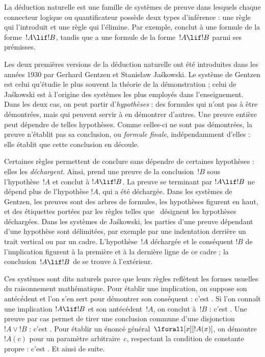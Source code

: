 \documentclass[../../../include/open-logic-section]{subfiles}
\begin{document}


La déduction naturelle est une famille de systèmes de preuve
dans lesquels chaque connecteur logique ou quantificateur possède
deux types d'inférence : une règle qui l'introduit et une règle
qui l'élimine. Par exemple, \Intro{\lif} conclut à une formule
de la forme~$!A \lif !B$, tandis que \Elim{\lif} a une formule
de la forme~$!A \lif !B$ parmi ses prémisses.

Les deux premières versions de la déduction naturelle ont été
introduites dans les années 1930 par Gerhard Gentzen et
Stanisław Jaśkowski. Le système de Gentzen est celui qu'étudie
le plus souvent la théorie de la démonstration ; celui de Jaśkowski
est à l'origine des systèmes les plus employés dans l'enseignement.
Dans les deux cas, on peut partir d'\emph{hypothèses} :
des formules qui n'ont pas à être démontrées, mais qui peuvent
servir à en démontrer d'autres. Une preuve entière peut dépendre
de telles hypothèses. Comme celles-ci ne sont pas démontrées,
la preuve n'établit pas sa conclusion, ou \emph{formule finale},
indépendamment d'elles : elle établit que cette conclusion
en découle.

Certaines règles permettent de conclure sans dépendre de certaines
hypothèses : elles les \emph{déchargent}. Ainsi, \Intro{\lif}
prend une preuve de la conclusion~$!B$ sous l'hypothèse~$!A$
et conclut à $!A \lif !B$. La preuve se terminant par $!A \lif !B$
ne dépend plus de l'hypothèse $!A$, qui a été déchargée.
Dans les systèmes de Gentzen, les preuves sont des arbres de formules,
les hypothèses figurent en haut, et des étiquettes portées par
les règles telles que~\Intro{\lif} désignent les hypothèses
déchargées. Dans les systèmes de Jaśkowski, les parties d'une
preuve dépendant d'une hypothèse sont délimitées, par exemple
par une indentation derrière un trait vertical ou par un cadre.
L'hypothèse~$!A$ déchargée et le conséquent $!B$ de l'implication
figurent à la première et à la dernière ligne de ce cadre ;
la conclusion~$!A \lif !B$ de \Intro{\lif} se trouve à l'extérieur.

Ces systèmes sont dits naturels parce que leurs règles reflètent
les formes usuelles du raisonnement mathématique.
Pour établir une implication, on suppose son antécédent et
l'on s'en sert pour démontrer son conséquent : c'est
\Intro{\lif}. Si l'on connaît une implication $!A \lif !B$
et son antécédent~$!A$, on conclut à~$!B$ : c'est \Elim{\lif}.
Une preuve par cas permet de tirer une conclusion commune
d'une disjonction~$!A \lor !B$ : c'est \Elim{\lor}.
Pour établir un énoncé général~$\lforall[x][!A(x)]$,
on démontre $!A(c)$ pour un paramètre arbitraire~$c$,
respectant la condition de constante propre :
c'est \Intro{\lforall}. Et ainsi de suite.
\end{document}
